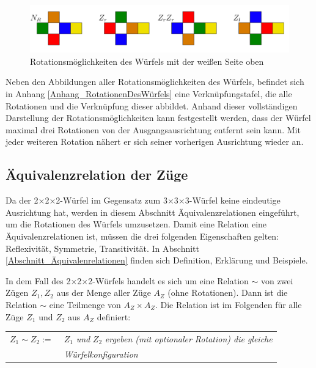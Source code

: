 \documentclass[12pt,a4paper, usenames, dvipsnames]{article}
\theoremstyle{mystyle}
\theoremstyle{definition}
\newcommand{\Ttwo}{2$\times$2$\times$2-}
\newcommand{\Tthree}{3$\times$3$\times$3-}
\begin{document}
\begin{figure}[H]
\centering
\includegraphics[scale=0.063]{RotationWeiss.png}
\caption{Rotationsmöglichkeiten des Würfels mit der weißen Seite oben}
\label{AbbildungWürfelRotationWeisseSeite}
\end{figure}

Neben den Abbildungen aller Rotationsmöglichkeiten des Würfels, befindet sich in Anhang \ref{Anhang_RotationenDesWürfels} eine Verknüpfungstafel, die alle Rotationen und die Verknüpfung dieser abbildet. Anhand dieser vollständigen Darstellung der Rotationsmöglichkeiten kann festgestellt werden, dass der Würfel maximal drei Rotationen von der Ausgangsausrichtung entfernt sein kann. Mit jeder weiteren Rotation nähert er sich seiner vorherigen Ausrichtung wieder an.





%
%
%
%
%
%
%
%
%
%
%
%
%
%
%
%
%
%
%
%

\subsection{Äquivalenzrelation der Züge}
\label{Abschnitt_ÄquivalenzrelationDerZüge}

Da der \Ttwo Würfel im Gegensatz zum \Tthree Würfel keine eindeutige Ausrichtung hat, werden in diesem Abschnitt Äquivalenzrelationen eingeführt, um die Rotationen des Würfels umzusetzen.
Damit eine Relation eine Äquivalenzrelationen ist, müssen die drei folgenden Eigenschaften gelten: Reflexivität, Symmetrie, Transitivität. In Abschnitt \ref{Abschnitt_Äquivalenrelationen} finden sich Definition, Erklärung und Beispiele.

In dem Fall des \Ttwo Würfels handelt es sich um eine Relation $\sim$ von zwei Zügen $Z_1, Z_2$ aus der Menge aller Züge $A_Z$ (ohne Rotationen). Dann ist die Relation $\sim$ eine Teilmenge von $A_Z \times A_Z$. 
Die Relation ist im Folgenden für alle Züge $Z_1$ und $Z_2$ aus $A_Z$ definiert: 

\begin{center}
\begin{tabular}{l l}
$Z_1 \sim Z_2 := \ $  & $Z_1$ \textit{und} $Z_2$ \textit{ergeben (mit optionaler Rotation) die gleiche }\\
\  & \textit{Würfelkonfiguration} \\
\end{tabular} 
\end{center}
\end{document}
